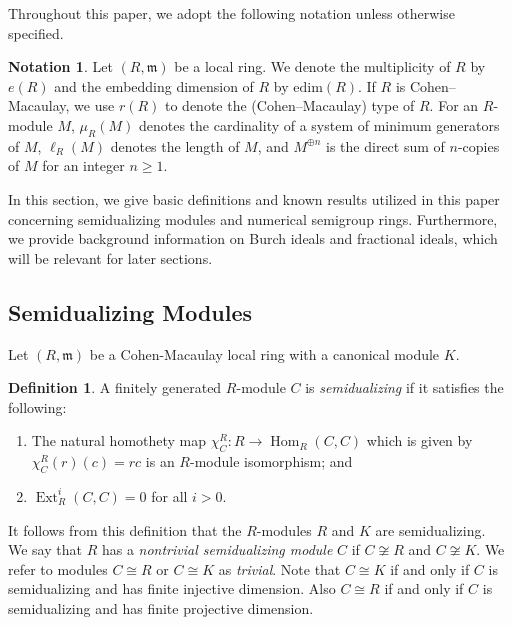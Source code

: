 \documentclass{amsart}
\newcommand{\m}{\mathfrak{m}}
\DeclareMathOperator{\Hom}{Hom}
\DeclareMathOperator{\Ext}{Ext}
\theoremstyle{plain}
\theoremstyle{definition}
\newtheorem{definition}[theorem]{Definition}
\newtheorem{notation}[theorem]{Notation}
\numberwithin{theorem}{section}
\numberwithin{equation}{section}
\numberwithin{equation}{theorem}
\begin{document}
Throughout this paper, we adopt the following notation unless otherwise specified. 

\begin{notation}
Let $(R,\m)$ be a local ring. We denote the multiplicity of $R$ by $e(R)$ and the embedding dimension of $R$ by $\mathrm{edim}(R)$. If $R$ is Cohen--Macaulay, we use $r(R)$ to denote the (Cohen--Macaulay) type of $R$.  For an $R$-module $M$, $\mu_R(M)$ denotes the cardinality of a system of minimum generators of $M$, $\ell_R(M)$ denotes the length of $M$, and $M^{\oplus n}$ is the direct sum of $n$-copies of $M$ for an integer $n\ge 1$. 
\end{notation}

In this section, we give basic definitions and known results utilized in this paper concerning semidualizing modules and numerical semigroup rings. Furthermore, we provide background information on Burch ideals and fractional ideals, which will be relevant for later sections. 

\subsection{Semidualizing Modules} 

Let $(R, \m)$ be a Cohen-Macaulay local ring with a canonical module $K$. 

\begin{definition}
A finitely generated $R$-module $C$ is \emph{semidualizing} if it satisfies the following: 

\begin{enumerate}[ \rm (a)]
\item The natural homothety map $\chi_C^R:R \rightarrow \Hom_R(C, C)$ which is given by $\chi_C^R(r)(c)=rc$ is an $R$-module isomorphism; and 
\item $\Ext_R^i(C,C)=0$ for all $i>0$. 
\end{enumerate}

\end{definition} 

It follows from this definition that the $R$-modules $R$ and $K$ are semidualizing. \\

We say that $R$ has a {\it nontrivial semidualizing module} $C$ if $C\not \cong R$ and $C\not \cong K$. We refer to modules $C\cong R$ or $C\cong K$ as {\it trivial}. Note that $C\cong K$ if and only if $C$ is semidualizing and has finite injective dimension. Also $C\cong R$ if and only if $C$ is semidualizing and has finite projective dimension.
\end{document}
